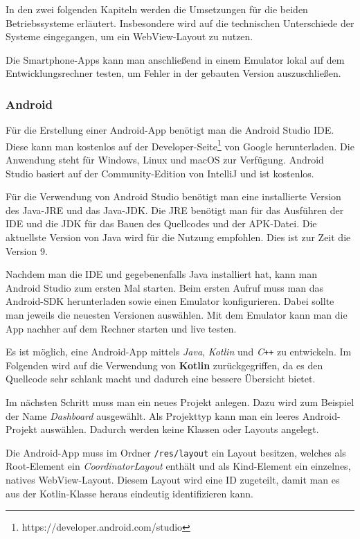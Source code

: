 In den zwei folgenden Kapiteln werden die Umsetzungen für die beiden Betriebssysteme erläutert. Insbesondere wird auf
die technischen Unterschiede der Systeme eingegangen, um ein WebView-Layout zu nutzen.

Die Smartphone-Apps kann man anschließend in einem Emulator lokal auf dem Entwicklungsrechner testen, um Fehler in der
gebauten Version auszuschließen.

\subsubsection{Android}
Für die Erstellung einer Android-App benötigt man die Android Studio IDE. Diese kann man kostenlos auf der
Developer-Seite\footnote{https://developer.android.com/studio} von Google herunterladen. Die Anwendung steht für
Windows, Linux und macOS zur Verfügung. Android Studio basiert auf der Community-Edition von IntelliJ und ist kostenlos.

Für die Verwendung von Android Studio benötigt man eine installierte Version des Java-JRE und das Java-JDK. Die JRE
benötigt man für das Ausführen der IDE und die JDK für das Bauen des Quellcodes und der APK-Datei. Die aktuellste
Version von Java wird für die Nutzung empfohlen. Dies ist zur Zeit die Version 9.

Nachdem man die IDE und gegebenenfalls Java installiert hat, kann man Android Studio zum ersten Mal starten. Beim ersten
Aufruf muss man das Android-SDK herunterladen sowie einen Emulator konfigurieren. Dabei sollte man jeweils die neuesten
Versionen auswählen. Mit dem Emulator kann man die App nachher auf dem Rechner starten und live testen.

Es ist möglich, eine Android-App mittels \textit{Java}, \textit{Kotlin} und \textit{C\texttt{++}} zu entwickeln. Im
Folgenden wird auf die Verwendung von \textbf{Kotlin} zurückgegriffen, da es den Quellcode sehr schlank macht und
dadurch eine bessere Übersicht bietet.

Im nächsten Schritt muss man ein neues Projekt anlegen. Dazu wird zum Beispiel der Name \textit{Dashboard} ausgewählt.
Als Projekttyp kann man ein leeres Android-Projekt auswählen. Dadurch werden keine Klassen oder Layouts angelegt.

Die Android-App muss im Ordner \texttt{/res/layout} ein Layout besitzen, welches als Root-Element ein
\textit{CoordinatorLayout} enthält und als Kind-Element ein einzelnes, natives WebView-Layout. Diesem Layout wird eine
ID zugeteilt, damit man es aus der Kotlin-Klasse heraus eindeutig identifizieren kann.

